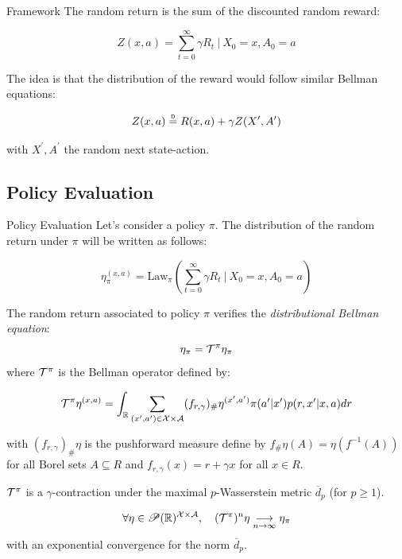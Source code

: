 \documentclass[10pt]{beamer}
\begin{document}
\begin{frame}{Framework}
    The random return is the sum of the discounted random reward:

    \begin{equation}
        Z(x,a) = \sum_{t = 0}^{\infty} \gamma R_t \ |\ X_0 = x, A_0 = a
    \end{equation}
    
    The idea is that the distribution of the reward would follow similar Bellman equations:
    
    \begin{equation}\label{randvarbellman}
        Z(x,a) \deq R(x,a) + \gamma Z(X^\prime, A^\prime)
    \end{equation}
    
    with $X^\prime, A^\prime$ the random next state-action.
\end{frame}


\subsection*{Policy Evaluation}
\begin{frame}{Policy Evaluation}
    Let’s consider a policy $\pi$. The distribution of the random return under $\pi$ will be written as follows:

    \[ \eta_\pi^{(x,a)} = \text{Law}_\pi \left( \sum_{t = 0}^{\infty} \gamma R_t \ | \ X_0 = x, A_0 = a \right) \]

    The random return associated to policy $\pi$ verifies the \emph{distributional Bellman equation}:
    \[\eta_\pi = \mathcal{T}^\pi \eta_\pi \]
    where $\mathcal{T}^\pi$ is the Bellman operator defined by:
    
    \[
        \mathcal{T}^\pi \eta^{(x,a)} = \int_{\mathbb{R}} \sum_{(x^\prime,a^\prime)\in \mathcal{X} \times \mathcal{A}} (f_{r,\gamma})_\#\eta^{(x^\prime,a^\prime)}\pi(a^\prime|x^\prime)p(r,x^\prime|x,a)dr
    \]

    with $(f_{r,\gamma})_\#\eta$ is the pushforward measure define by $f_\#\eta(A) = \eta(f^{-1}(A))$ for all Borel sets $A\subseteq R$ and $f_{r,\gamma}(x) = r + \gamma x$ for all $x \in R$.
\end{frame}

\begin{frame}
    \begin{proposition}
        $\mathcal{T}^\pi$ is a $\gamma$-contraction under the maximal $p$-Wasserstein metric $\overline{d}_p$ (for $p \geq 1$).
    \end{proposition}
    \begin{corollary}
        \[ \forall \eta \in \mathscr{P}(\mathbb{R})^{\mathcal{X} \times \mathcal{A}}, \quad (\mathcal{T}^\pi )^n \eta \underset{n \rightarrow \infty}{\longrightarrow} \eta_\pi \]
        with an exponential convergence for the norm $\overline{d}_p$.
    \end{corollary}
\end{frame}
\end{document}
